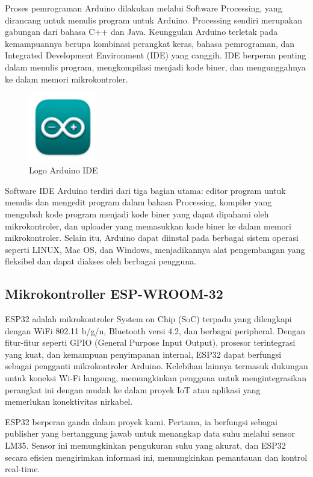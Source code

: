 Proses pemrograman Arduino dilakukan melalui Software Processing, yang dirancang untuk menulis program untuk Arduino. Processing sendiri merupakan gabungan dari bahasa C++ dan Java. Keunggulan Arduino terletak pada kemampuannya berupa kombinasi perangkat keras, bahasa pemrograman, dan Integrated Development Environment (IDE) yang canggih. IDE berperan penting dalam menulis program, mengkompilasi menjadi kode biner, dan mengunggahnya ke dalam memori mikrokontroler\cite{arduino-ide}.
\begin{figure}[H]
    \centering
    \includegraphics[width=3cm]{image/arduino-ide.png}
    \caption{Logo Arduino IDE}
    \label{fig:arduino-ide}
\end{figure}
Software IDE Arduino terdiri dari tiga bagian utama: editor program untuk menulis dan mengedit program dalam bahasa Processing, kompiler yang mengubah kode program menjadi kode biner yang dapat dipahami oleh mikrokontroler, dan uploader yang memasukkan kode biner ke dalam memori mikrokontroler. Selain itu, Arduino dapat diinstal pada berbagai sistem operasi seperti LINUX, Mac OS, dan Windows, menjadikannya alat pengembangan yang fleksibel dan dapat diakses oleh berbagai pengguna.\cite{arduino-ide}


\subsection{Mikrokontroller ESP-WROOM-32}

ESP32 adalah mikrokontroler System on Chip (SoC) terpadu yang dilengkapi dengan WiFi 802.11 b/g/n, Bluetooth versi 4.2, dan berbagai peripheral. Dengan fitur-fitur seperti GPIO (General Purpose Input Output), prosesor terintegrasi yang kuat, dan kemampuan penyimpanan internal, ESP32 dapat berfungsi sebagai pengganti mikrokontroler Arduino. Kelebihan lainnya termasuk dukungan untuk koneksi Wi-Fi langsung, memungkinkan pengguna untuk mengintegrasikan perangkat ini dengan mudah ke dalam proyek IoT atau aplikasi yang memerlukan konektivitas nirkabel. \cite{esp32}


ESP32 berperan ganda dalam proyek kami. Pertama, ia berfungsi sebagai publisher yang bertanggung jawab untuk menangkap data suhu melalui sensor LM35. Sensor ini memungkinkan pengukuran suhu yang akurat, dan ESP32 secara efisien mengirimkan informasi ini, memungkinkan pemantauan dan kontrol real-time.

